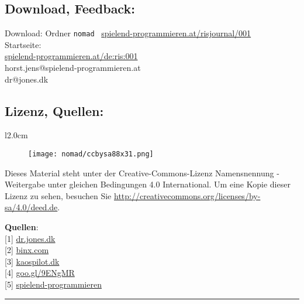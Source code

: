 \documentclass[10pt,a4paper,ngerman,twoside]{article} %
\newcommand{\SepRule}{\noindent	%
\begin{center}
\rule{250pt}{1pt} %
\end{center}
}
\begin{document}
\subsection*{Download, Feedback:}
\footnotesize{
Download: Ordner \texttt{nomad} \Mundus\ \href{http://spielend-programmieren.at/risjournal/001}{spielend-programmieren.at/risjournal/001}\\
Startseite:\\
\href{http://spielend-programmieren.at/de:ris:001}{spielend-programmieren.at/de:ris:001}\\ 
\Letter\: horst.jens@spielend-programmieren.at\\
\Letter\: dr@jones.dk\\}
\normalsize 


\subsection*{Lizenz, Quellen:}

\begin{wrapfigure}{l}{2.0cm}
\begin{figure}
\texttt{[image: nomad/ccbysa88x31.png]}
\end{figure}
\end{wrapfigure}
Dieses Material steht unter der Creative-Commons-Lizenz Namensnennung - Weitergabe unter gleichen Bedingungen 4.0 International. Um eine Kopie dieser Lizenz zu sehen, besuchen Sie \url{http://creativecommons.org/licenses/by-sa/4.0/deed.de}.

\textbf{Quellen}: \\
{[}1{]} \href{http://dr.jones.dk}{dr.jones.dk} \\
{[}2{]} \href{http://binx.com/}{binx.com} \\
{[}3{]} \href{http://kaospilot.dk/}{kaospilot.dk} \\
{[}4{]} \href{http://goo.gl/9ENgMR}{goo.gl/9ENgMR} \\ %
{[}5{]} \href{http://spielend-programmieren.at}{spielend-programmieren}

\SepRule
\end{document}
